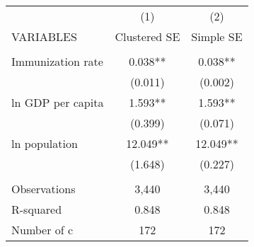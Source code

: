 \begin{tabular}{lcc} \hline
 & (1) & (2) \\
VARIABLES & Clustered SE & Simple SE \\ \hline
 &  &  \\
Immunization rate & 0.038** & 0.038** \\
 & (0.011) & (0.002) \\
ln GDP per capita & 1.593** & 1.593** \\
 & (0.399) & (0.071) \\
ln population & 12.049** & 12.049** \\
 & (1.648) & (0.227) \\
 &  &  \\
Observations & 3,440 & 3,440 \\
R-squared & 0.848 & 0.848 \\
 Number of c & 172 & 172 \\ \hline
\end{tabular}
